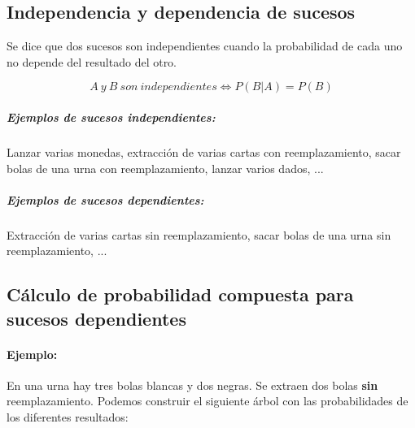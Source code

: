 \subsection{Independencia y dependencia de sucesos}
Se dice que dos sucesos son independientes cuando la probabilidad de cada uno no depende del resultado del otro. 

$$A\ y \ B\ son \ independientes \Longleftrightarrow P(B|A)=P(B)$$

\subparagraph{Ejemplos de sucesos independientes:}  Lanzar varias monedas, extracción de varias cartas con reemplazamiento, sacar bolas de una urna con reemplazamiento, lanzar varios dados, ...
\subparagraph{Ejemplos de sucesos dependientes:}  Extracción de varias cartas sin reemplazamiento, sacar bolas de una urna sin reemplazamiento, ...

\subsection{Cálculo de probabilidad compuesta para sucesos dependientes}
\paragraph{Ejemplo:} En una urna hay tres bolas blancas y dos negras. Se extraen dos bolas \textbf{sin} reemplazamiento. Podemos construir el siguiente árbol con las probabilidades de los diferentes resultados:

